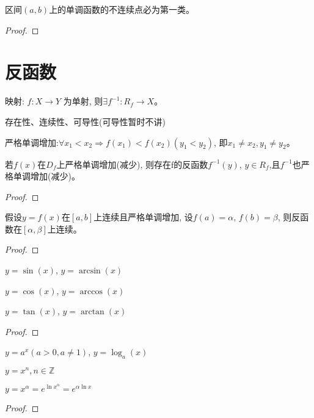 \documentclass[lang=cn]{elegantbook}
\begin{document}
\begin{proposition}
    区间$(a, b)$上的单调函数的不连续点必为第一类。    
\end{proposition}
\begin{proof}
    
\end{proof}
\section{反函数}
映射: $f: X \to Y$ 为单射, 则$\exists f^{-1}: R_f \to X$。

存在性、连续性、可导性(可导性暂时不讲)

严格单调增加:$\forall x_1 < x_2 \Rightarrow f(x_1) < f(x_2)(y_1 < y_2)$, 即$x_1 \neq x_2, y_1 \neq y_2$。
\begin{theorem}[反函数存在定理]\label{theorem:inverse-func-exists}
    若$f(x)$在$D_f$上严格单调增加(减少), 则存在f的反函数$f^{-1}(y)$, $y \in R_f $,且$f^{-1}$也严格单调增加(减少)。
\end{theorem}
\begin{proof}
    
\end{proof}

\begin{theorem}[反函数连续性定理]
    假设$y = f(x)$在$[a, b]$上连续且严格单调增加, 设$f(a)=\alpha$, $f(b)=\beta$, 则反函数在$[\alpha, \beta]$上连续。
\end{theorem}
\begin{proof}
    
\end{proof}

\begin{proposition}
    $y = \sin(x)$, $y = \arcsin(x)$

    $y = \cos(x)$, $y = \arccos(x)$

    $y = \tan(x)$, $y = \arctan(x)$
\end{proposition}
\begin{proof}
    
\end{proof}
\begin{proposition}
    $y = a^x(a > 0, a \neq 1)$, $y = \log_a(x)$

    $y = x^n, n \in \mathbb{Z}$

    $y = x^\alpha = e^{\ln x^\alpha} = e^{\alpha \ln x}$
\end{proposition}
\begin{proof}
    
\end{proof}
\end{document}

